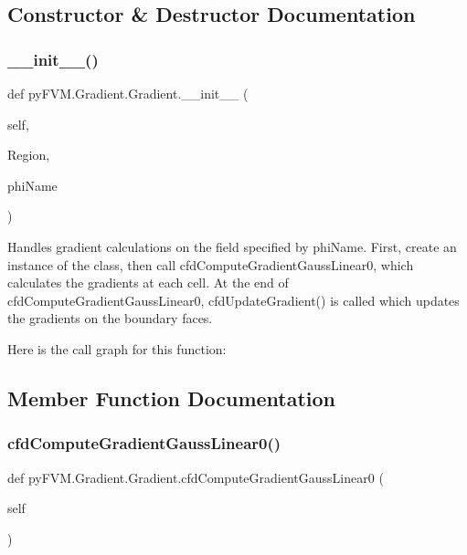 \subsection{Constructor \& Destructor Documentation}
\mbox{\label{classpy_f_v_m_1_1_gradient_1_1_gradient_a3a3b4c96ac7a2ab3de27efbf25fd5870}} 
\subsubsection{\texorpdfstring{\_\_init\_\_()}{\_\_init\_\_()}}
{\footnotesize\ttfamily def py\+F\+V\+M.\+Gradient.\+Gradient.\+\_\+\+\_\+init\+\_\+\+\_\+ (\begin{DoxyParamCaption}\item[{}]{self,  }\item[{}]{Region,  }\item[{}]{phi\+Name }\end{DoxyParamCaption})}

\begin{DoxyVerb}Handles gradient calculations on the field specified by phiName. First,
create an instance of the class, then call cfdComputeGradientGaussLinear0,
which calculates the gradients at each cell. At the end of 
cfdComputeGradientGaussLinear0, cfdUpdateGradient() is called which updates
the gradients on the boundary faces.
\end{DoxyVerb}
 Here is the call graph for this function\+:


\subsection{Member Function Documentation}
\mbox{\label{classpy_f_v_m_1_1_gradient_1_1_gradient_abcf7ce6649997be35a814b72be1ef77c}} 
\subsubsection{\texorpdfstring{cfdComputeGradientGaussLinear0()}{cfdComputeGradientGaussLinear0()}}
{\footnotesize\ttfamily def py\+F\+V\+M.\+Gradient.\+Gradient.\+cfd\+Compute\+Gradient\+Gauss\+Linear0 (\begin{DoxyParamCaption}\item[{}]{self }\end{DoxyParamCaption})}

